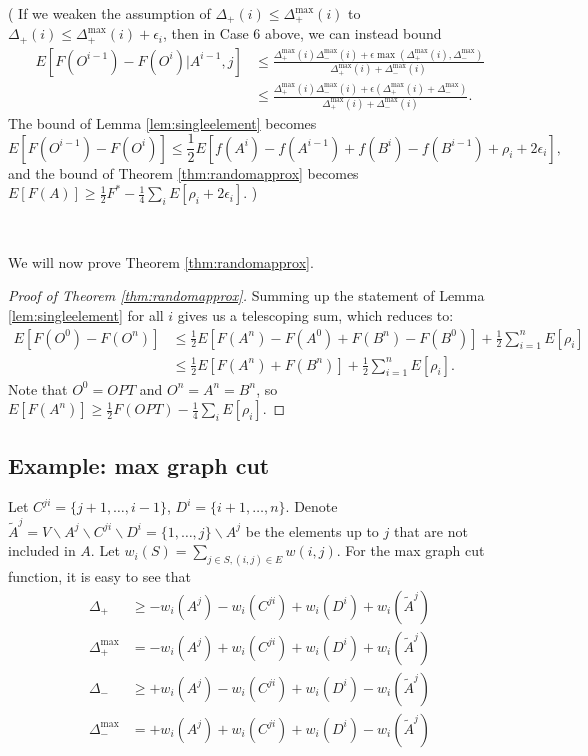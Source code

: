 ( If we weaken the assumption of $\Delta_+(i) \leq \Delta_+^{\max}(i)$ to $\Delta_+(i) \leq \Delta_+^{\max}(i) + \epsilon_i$, then in Case 6 above, we can instead bound
\begin{align*}
E[F(O^{i-1})-F(O^i)|A^{i-1}, j]
&\leq \frac{\Delta_+^{\max}(i) \Delta_-^{\max}(i) + \epsilon\max(\Delta_+^{\max}(i), \Delta_-^{\max})}{\Delta_+^{\max}(i) + \Delta_-^{\max}(i)}\\
&\leq \frac{\Delta_+^{\max}(i) \Delta_-^{\max}(i) + \epsilon(\Delta_+^{\max}(i) + \Delta_-^{\max})}{\Delta_+^{\max}(i) + \Delta_-^{\max}(i)}.
\end{align*}
The bound of Lemma \ref{lem:singleelement} becomes
\[E[F(O^{i-1})-F(O^i)] \leq \frac{1}{2} E[f(A^i) - f(A^{i-1}) + f(B^i) - f(B^{i-1}) + \rho_i + 2\epsilon_i],\]
and the bound of Theorem \ref{thm:randomapprox} becomes $E[F(A)] \geq \frac{1}{2} F^* - \frac{1}{4}\sum_iE[\rho_i + 2\epsilon_i]$.
)

~

We will now prove Theorem \ref{thm:randomapprox}.

\begin{proof} [Proof of Theorem \ref{thm:randomapprox}]
Summing up the statement of Lemma \ref{lem:singleelement} for all $i$ gives us a telescoping sum, which reduces to:
\begin{align*}
E[F(O^0)-F(O^n)]
&\leq \frac{1}{2} E[F(A^n) - F(A^0) + F(B^n) - F(B^0)] + \frac{1}{2}\sum_{i=1}^nE[\rho_i]\\
&\leq \frac{1}{2} E[F(A^n) + F(B^n)] + \frac{1}{2}\sum_{i=1}^nE[\rho_i].
\end{align*}
Note that $O^0 = OPT$ and $O^n = A^n = B^n$, so $E[F(A^n)] \geq \frac{1}{2} F(OPT) - \frac{1}{4}\sum_iE[\rho_i]$.
\end{proof}









\subsection{Example: max graph cut}
Let $C^{ji} = \{j+1,\dots,i-1\}$, $D^i = \{i+1,\dots,n\}$.
Denote $\tilde{A}^j = V\backslash A^j\backslash C^{ji}\backslash D^i = \{1,\dots,j\}\backslash A^j$ be the elements up to $j$ that are not included in $A$.
Let $w_i(S) = \sum_{j\in S, (i,j)\in E} w(i,j)$.
For the max graph cut function, it is easy to see that 
\begin{align*}
\Delta_+        &\geq - w_i(A^j) -w_i(C^{ji}) + w_i(D^i) + w_i(\tilde{A}^j)\\
\Delta_+^{\max} &=    - w_i(A^j) + w_i(C^{ji}) + w_i(D^i) + w_i(\tilde{A}^j)\\
\Delta_-        &\geq + w_i(A^j) - w_i(C^{ji}) + w_i(D^i) - w_i(\tilde{A}^j)\\
\Delta_-^{\max} &= + w_i(A^j) + w_i(C^{ji}) + w_i(D^i) - w_i(\tilde{A}^j)
\end{align*}

